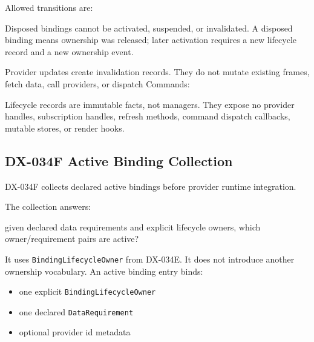 Allowed transitions are:



Disposed bindings cannot be activated, suspended, or invalidated. A disposed binding means ownership was released; later activation requires a new lifecycle record and a new ownership event.

Provider updates create invalidation records. They do not mutate existing frames, fetch data, call providers, or dispatch Commands:



Lifecycle records are immutable facts, not managers. They expose no provider handles, subscription handles, refresh methods, command dispatch callbacks, mutable stores, or render hooks.

\subsection{DX-034F Active Binding Collection}\label{record-132-dx-034f-active-binding-collection}

DX-034F collects declared active bindings before provider runtime integration.

The collection answers:

\begin{CodeBlock}
given declared data requirements and explicit lifecycle owners,
which owner/requirement pairs are active?
\end{CodeBlock}

It uses \texttt{B\allowbreak{}i\allowbreak{}n\allowbreak{}d\allowbreak{}i\allowbreak{}n\allowbreak{}g\allowbreak{}L\allowbreak{}i\allowbreak{}f\allowbreak{}e\allowbreak{}c\allowbreak{}y\allowbreak{}c\allowbreak{}l\allowbreak{}e\allowbreak{}O\allowbreak{}w\allowbreak{}n\allowbreak{}e\allowbreak{}r} from DX-034E. It does not introduce another ownership vocabulary. An active binding entry binds:

\begin{itemize}
\tightlist
\item
  one explicit \texttt{B\allowbreak{}i\allowbreak{}n\allowbreak{}d\allowbreak{}i\allowbreak{}n\allowbreak{}g\allowbreak{}L\allowbreak{}i\allowbreak{}f\allowbreak{}e\allowbreak{}c\allowbreak{}y\allowbreak{}c\allowbreak{}l\allowbreak{}e\allowbreak{}O\allowbreak{}w\allowbreak{}n\allowbreak{}e\allowbreak{}r}
\item
  one declared \texttt{D\allowbreak{}a\allowbreak{}t\allowbreak{}a\allowbreak{}R\allowbreak{}e\allowbreak{}q\allowbreak{}u\allowbreak{}i\allowbreak{}r\allowbreak{}e\allowbreak{}m\allowbreak{}e\allowbreak{}n\allowbreak{}t}
\item
  optional provider id metadata
\end{itemize}

